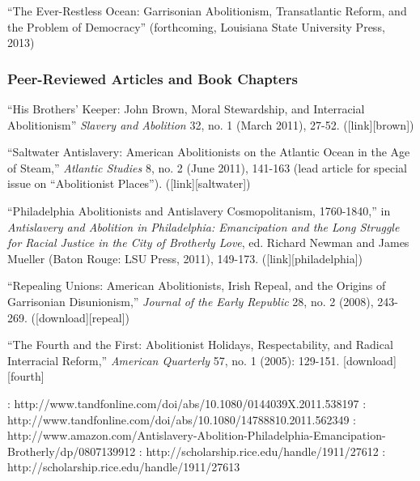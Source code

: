 \documentclass[11pt]{article}
\begin{document}
\ind ``The Ever-Restless Ocean: Garrisonian Abolitionism, Transatlantic
Reform, and the Problem of Democracy'' (forthcoming, Louisiana State
University Press, 2013)

\subsubsection{Peer-Reviewed Articles and Book Chapters}

\ind ``His Brothers' Keeper: John Brown, Moral Stewardship, and
Interracial Abolitionism'' \emph{Slavery and Abolition} 32, no. 1 (March
2011), 27-52. ({[}link{]}{[}brown{]})

\ind ``Saltwater Antislavery: American Abolitionists on the Atlantic
Ocean in the Age of Steam,'' \emph{Atlantic Studies} 8, no. 2 (June
2011), 141-163 (lead article for special issue on ``Abolitionist
Places''). ({[}link{]}{[}saltwater{]})

\ind ``Philadelphia Abolitionists and Antislavery Cosmopolitanism,
1760-1840,'' in \emph{Antislavery and Abolition in Philadelphia:
Emancipation and the Long Struggle for Racial Justice in the City of
Brotherly Love}, ed. Richard Newman and James Mueller (Baton Rouge: LSU
Press, 2011), 149-173. ({[}link{]}{[}philadelphia{]})

\ind ``Repealing Unions: American Abolitionists, Irish Repeal, and the
Origins of Garrisonian Disunionism,'' \emph{Journal of the Early
Republic} 28, no. 2 (2008), 243-269. ({[}download{]}{[}repeal{]})

\ind ``The Fourth and the First: Abolitionist Holidays, Respectability,
and Radical Interracial Reform,'' \emph{American Quarterly} 57, no. 1
(2005): 129-151. {[}download{]}{[}fourth{]}

\ind [brown]:
http://www.tandfonline.com/doi/abs/10.1080/0144039X.2011.538197
\ind [saltwater]:
http://www.tandfonline.com/doi/abs/10.1080/14788810.2011.562349
\ind [philadelphia]:
http://www.amazon.com/Antislavery-Abolition-Philadelphia-Emancipation-Brotherly/dp/0807139912
\ind [repeal]: http://scholarship.rice.edu/handle/1911/27612
\ind [fourth]: http://scholarship.rice.edu/handle/1911/27613
\end{document}
